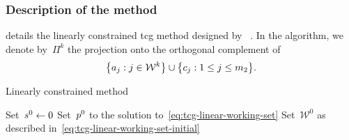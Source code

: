 \subsubsection{Description of the  method}

 details the linearly constrained \gls{tcg} method designed by \citeauthor{Powell_2015}~\cite{Powell_2015}.
In the algorithm, we denote by~$\Pi^k$ the projection onto the orthogonal complement of
\begin{equation*}
    \set[\big]{a_j : j \in \mathcal{W}^k} \cup \set[\big]{c_j : 1 \le j \le m_2}.
\end{equation*}

\begin{algorithm}
    \caption[Linearly constrained  method]{Linearly constrained  method~\cite[\S~3, \S~5]{Powell_2015}}
    \label{alg:lctcg}
    \DontPrintSemicolon
    \onehalfspacing
    Set~$\sstep[0] \gets 0$\;
    Set~$\pstep[0]$ to the solution to~\cref{eq:tcg-linear-working-set}\; 
    Set~$\mathcal{W}^0$ as described in~\cref{eq:tcg-linear-working-set-initial}\; 
\end{algorithm}
